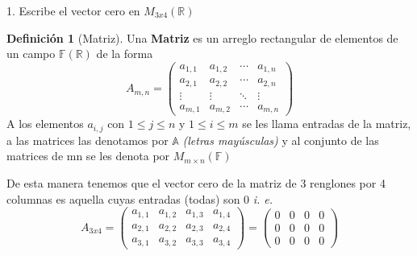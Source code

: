 \documentclass[letterpaper]{article}
\newcommand{\F}{\mathds{F}}
\newcommand{\R}{\mathds{R}}
\renewcommand{\*}{\cdot}
\theoremstyle{definition}
\newtheorem{definition}{Definición}[section]
\begin{document}
	1. Escribe el vector cero en $M_{3x4}(\mathbb{R})$
		\begin{definition}[Matriz]
		Una \textbf{Matriz} es un arreglo rectangular de elementos de un campo $ \F(\R) $ de la forma
		\begin{equation*}
		A_{m,n} = 
		\begin{pmatrix}
		a_{1,1} & a_{1,2} & \cdots & a_{1,n} \\
		a_{2,1} & a_{2,2} & \cdots & a_{2,n} \\
		\vdots  & \vdots  & \ddots & \vdots  \\
		a_{m,1} & a_{m,2} & \cdots & a_{m,n} 
		\end{pmatrix}
		\end{equation*}
		A los elementos $ a_{i,j} $ con $ 1 \leq j \leq n $ y $ 1 \leq i \leq m $ se les llama entradas de la matriz, a las matrices las denotamos por $ \mathds{A} $ 				\textit{(letras mayúsculas)} y al conjunto de las matrices de mn se les denota por $ M_{m\times n}(\F) $
		
	\end{definition}
	De esta manera tenemos que el vector cero de la matriz de 3 renglones por 4 columnas es aquella cuyas entradas (todas) son 0 \textit{i. e. }
		\begin{equation*}
		A_{3x4} = 
		\begin{pmatrix}
		a_{1,1} & a_{1,2} & a_{1,3} & a_{1,4} \\
		a_{2,1} & a_{2,2} & a_{2,3} & a_{2,4} \\
		a_{3,1} & a_{3,2} & a_{3,3} & a_{3,4} 
		\end{pmatrix}
		= 
		\begin{pmatrix}
		0 & 0 & 0 & 0\\
		0 & 0 & 0 & 0 \\
		0 & 0 & 0 & 0
		\end{pmatrix}
		\end{equation*}
		
	
	
\end{document}
